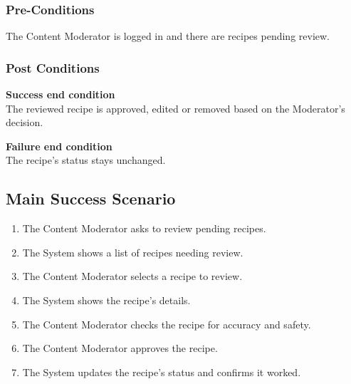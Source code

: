 \documentclass[10pt,letterpaper]{article}
\begin{document}
\subsubsection*{Pre-Conditions}
The Content Moderator is logged in and there are recipes pending review.

\subsubsection*{Post Conditions}

\textbf{Success end condition}\\
The reviewed recipe is approved, edited or removed based on the Moderator's decision.

\textbf{Failure end condition}\\
The recipe's status stays unchanged.

\subsection*{Main Success Scenario}
\begin{enumerate}
    \item The Content Moderator asks to review pending recipes.
    \item The System shows a list of recipes needing review.
    \item The Content Moderator selects a recipe to review.
    \item The System shows the recipe's details.
    \item The Content Moderator checks the recipe for accuracy and safety.
    \item The Content Moderator approves the recipe.
    \item The System updates the recipe's status and confirms it worked.
\end{enumerate}
\end{document}
